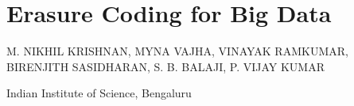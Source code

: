 \chapter{Erasure Coding for Big Data}

\begin{center}
\uppercase{M. Nikhil Krishnan, Myna Vajha, Vinayak Ramkumar},\\
\uppercase{Birenjith Sasidharan, S. B. Balaji, P. Vijay Kumar}

\medskip
Indian Institute of Science, Bengaluru 
\end{center}

\vfill


\noindent{}

\vfill
\eject


